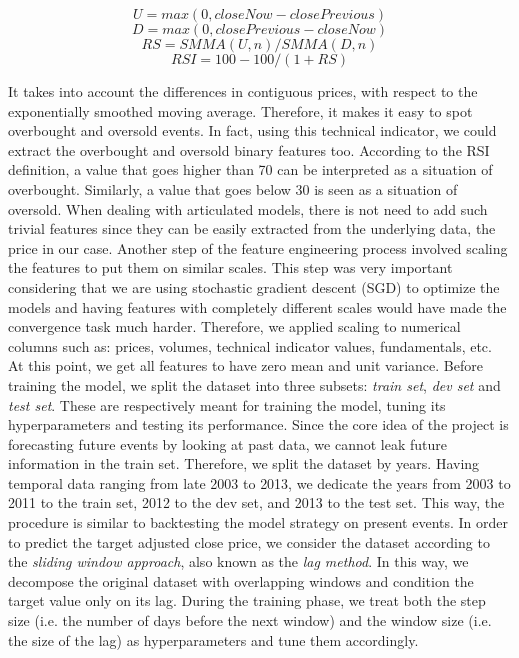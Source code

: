 \documentclass{article}
\begin{document}
$$
U = max(0, closeNow - closePrevious)
$$
$$
D = max(0, closePrevious - closeNow)
$$
$$
RS = SMMA(U,n)/SMMA(D,n)
$$
$$
RSI = 100 - 100/(1+RS)
$$

It takes into account the differences in contiguous prices, with respect to the
exponentially smoothed moving average. Therefore, it makes it easy to spot overbought
and oversold events. In fact, using this technical indicator, we could extract the
overbought and oversold binary features too. According to the RSI definition,
a value that goes higher than 70 can be interpreted as a situation of overbought.
Similarly, a value that goes below 30 is seen as a situation of oversold. 
When dealing with articulated models, there is not need to add such trivial features
since they can be easily extracted from the underlying data, the price in our case.
Another step of the feature engineering process involved scaling the features to put them
on similar scales. This step was very important considering that we are using stochastic gradient
descent (SGD) to optimize the models and having features with completely different scales would
have made the convergence task much harder. Therefore, we applied scaling to numerical columns such as: prices,
volumes, technical indicator values, fundamentals, etc. At this point, we get all features
to have zero mean and unit variance.
Before training the model, we split the dataset into three subsets: \emph{train set},
\emph{dev set} and \emph{test set}. These are respectively meant for training the model,
tuning its hyperparameters and testing its performance. Since the core idea of the project
is forecasting future events by looking at past data, we cannot leak future information in
the train set. Therefore, we split the dataset by years. Having temporal data ranging from
late 2003 to 2013, we dedicate the years from 2003 to 2011 to the train set, 2012 to the dev set, and
2013 to the test set. This way, the procedure is similar to backtesting the model strategy
on present events.
In order to predict the target adjusted close price, we consider the dataset according to the \emph{sliding window approach}, also known as the \emph{lag method}. In this way, we decompose the original dataset with overlapping windows and condition the target value only on its lag. During the training phase, we treat both the step size (i.e. the number of days before the next window) and the window size (i.e. the size of the lag) as hyperparameters and tune them accordingly.

\end{document}
